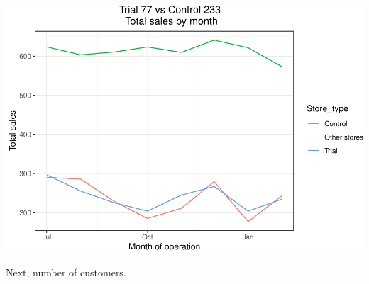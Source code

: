 \documentclass[]{article}
\begin{document}
\includegraphics{Task2_files/figure-latex/unnamed-chunk-1-1}

Next, number of customers.
\end{document}
